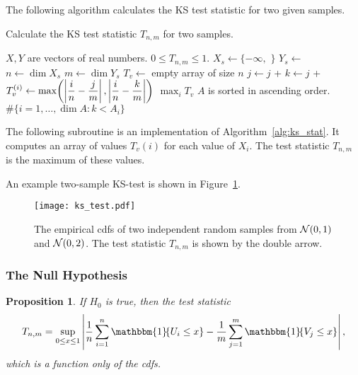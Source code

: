 \documentclass[letterpaper, reqno]{amsart}
\newtheorem{prop}{Proposition}[section]
\numberwithin{equation}{section}
\newcommand{\N}[2]{\mathcal{N}\mleft( #1, #2 \mright)}
\newcommand{\indic}[1]{\mathbbm{1}\!\mleft\{#1\mright\}} %
\newcommand{\sumi}[2]{\sum_{#1=1}^{#2}}
\newcommand{\avg}[2]{\frac{1}{#2}\sumi{#1}{#2}}
\begin{document}
\clearpage
The following algorithm calculates the KS test statistic for two given samples.

\begin{algorithm}[H]
  \caption{Calculate the KS test statistic $T_{n,m}$ for two samples.}
  \label{alg:ks_stat}
  \begin{algorithmic}[1]
    \Require $X, Y$ are vectors of real numbers.
    \Ensure $0 \le T_{n,m} \le 1$.
      \State $X_s \gets \{-\infty,$ $\}$
      \State $Y_s \gets$ 
      \State $n \gets \dim X_s$
      \State $m \gets \dim Y_s$
      \State $T_v \gets$ empty array of size $n$
        \State $j \gets j$ +  
        \State $k \gets j$ + 
        \State $\displaystyle{T_v^{(i)} \gets
          \max\mleft(\left|\frac{i}{n} - \frac{j}{m}\right|,
                \left|\frac{i}{n} - \frac{k}{m}\right|\mright)}$
      \EndFor
      \State\Return $\max_i T_v$
    \EndProcedure
      \Assert $A$ is sorted in ascending order.
      \State\Return $\#\{i=1,\dots,\dim A \colon k < A_i\}$
    \EndFunction
  \end{algorithmic}
\end{algorithm}

\clearpage
The following subroutine is an implementation of Algorithm~\ref{alg:ks_stat}. It
computes an array of values $T_v(i)$ for each value of $X_i$. The test statistic
$T_{n,m}$ is the maximum of these values.


\clearpage
An example two-sample KS-test is shown in Figure~\ref{fig:ks_test}.
\begin{figure}[!h]
  \centering
  \texttt{[image: ks\_test.pdf]}
  \caption{The empirical cdfs of two independent random samples from $\N{0}{1}$ and $\N{0}{2}$. The test statistic $T_{n,m}$ is shown by the double arrow.}
  \label{fig:ks_test}
\end{figure}

\subsubsection{The Null Hypothesis}
\begin{prop}
  If $H_0$ is true, then the test statistic
  \[ T_{n,m} = \sup_{0 \le x \le 1} \left| \avg{i}{n} \indic{U_i \le x}
- \avg{j}{m} \indic{V_j \le x} \right|, \]
  which is a function only of the cdfs.
\end{prop}
\end{document}
